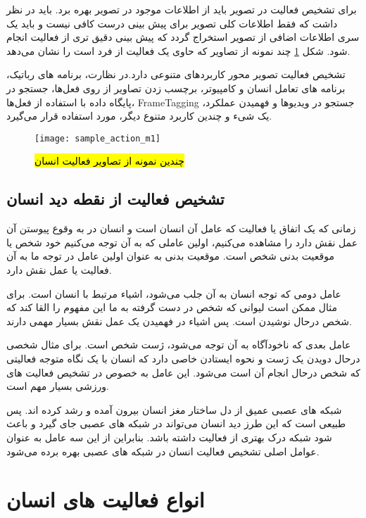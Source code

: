 برای تشخیص فعالیت در تصویر باید از اطلاعات موجود در تصویر بهره برد. باید در نظر داشت که فقط اطلاعات کلی تصویر برای پیش بینی درست کافی نیست و باید یک سری اطلاعات اضافی از تصویر استخراج گردد که پیش بینی دقیق تری از فعالیت انجام شود.
شکل
\ref{fig:humanActionM1}
چند نمونه از تصاویر که حاوی یک فعالیت از فرد است را نشان می‌دهد.

تشخیص فعالیت تصویر محور کاربردهای متنوعی دارد.در نظارت، برنامه های رباتیک،‌ برنامه های تعامل انسان و کامپیوتر، برچسب زدن تصاویر از روی فعل‌ها، جستجو در پایگاه داده با استفاده از فعل‌ها، %
\gls{FrameTagging}
،جستجو در ویدیوها و فهمیدن عملکرد یک شیء و چندین کاربرد متنوع دیگر، مورد استفاده قرار می‌گیرد.
\cite{UnderstandingActionRecogAll}

\begin{figure}[ht]
	\centerline{\texttt{[image: sample\_action\_m1]}}
	\caption{\hl{چندین نمونه از تصاویر فعالیت انسان}
		\cite{tasvirAvalChapterYek}
	}
	\label{fig:humanActionM1}
\end{figure}
\subsection{تشخیص فعالیت از نقطه دید انسان}
زمانی که یک اتفاق یا فعالیت که عامل آن انسان است و انسان در به وقوع پیوستن آن عمل نقش دارد را مشاهده می‌کنیم، اولین عاملی که به آن توجه می‌کنیم خود شخص یا موقعیت بدنی شخص است. موقعیت بدنی به عنوان اولین عامل در توجه ما به آن فعالیت یا عمل نقش دارد.

عامل دومی که توجه انسان به آن جلب می‌شود، اشیاء مرتبط با انسان است. برای مثال ممکن است لیوانی که شخص در دست گرفته به ما این مفهوم را القا کند که شخص درحال نوشیدن است. پس اشیاء در فهمیدن یک عمل نقش بسیار مهمی دارند.

عامل بعدی که ناخودآگاه به آن توجه می‌شود، ژست شخص است. برای مثال شخصی درحال دویدن یک ژست و نحوه ایستادن خاصی دارد که انسان با یک نگاه متوجه فعالیتی که شخص درحال انجام آن است می‌شود. این عامل به خصوص در تشخیص فعالیت های ورزشی بسیار مهم است.

شبکه های عصبی عمیق از دل ساختار مغز انسان بیرون آمده و رشد کرده اند. پس طبیعی است که این طرز دید انسان می‌تواند در شبکه های عصبی جای گیرد و باعث شود شبکه درک بهتری از فعالیت داشته باشد. بنابراین از این سه عامل به عنوان عوامل اصلی تشخیص فعالیت انسان در شبکه های عصبی بهره برده می‌شود.

\section{انواع فعالیت های انسان}

